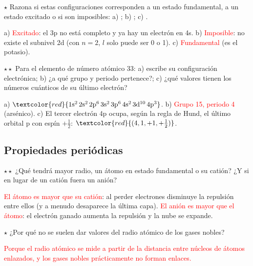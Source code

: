 \begin{exercise}
    \(\star\) Razona si estas configuraciones corresponden a un estado fundamental, a un estado excitado o si son imposibles:\newline
    a) ; b) ; c) .
    \begin{solu}
        a) \textcolor{red}{Excitado}: el 3p no está completo y ya hay un electrón en 4s. b) \textcolor{red}{Imposible}: no existe
        el subnivel 2d (con \(n = 2\), \(l\) solo puede ser 0 o 1). c) \textcolor{red}{Fundamental} (es el potasio).
    \end{solu}
\end{exercise}

\begin{exercise}
    \(\star\star\) Para el elemento de número atómico 33: a) escribe su configuración electrónica; b) ¿a qué grupo y periodo
    pertenece?; c) ¿qué valores tienen los números cuánticos de su último electrón?
    \begin{solu}
        a) \(\textcolor{red}{\conf{1s^2\,2s^2\,2p^6\,3s^2\,3p^6\,4s^2\,3d^{10}\,4p^3}}\). b) \textcolor{red}{Grupo 15, periodo 4}
        (arsénico). c) El tercer electrón 4p ocupa, según la regla de Hund, el último orbital p con espín \(+\frac{1}{2}\):
        \(\textcolor{red}{(4, 1, +1, +\frac{1}{2})}\).
    \end{solu}
\end{exercise}

\subsection{Propiedades periódicas}

\begin{exercise}
    \(\star\star\) ¿Qué tendrá mayor radio, un átomo en estado fundamental o su catión? ¿Y si en lugar de un catión fuera un anión?
    \begin{solu}
        \textcolor{red}{El átomo es mayor que su catión}: al perder electrones disminuye la repulsión entre ellos (y a menudo
        desaparece la última capa). \textcolor{red}{El anión es mayor que el átomo}: el electrón ganado aumenta la repulsión y la
        nube se expande.
    \end{solu}
\end{exercise}

\begin{exercise}
    \(\star\) ¿Por qué no se suelen dar valores del radio atómico de los gases nobles?
    \begin{solu}
        \textcolor{red}{Porque el radio atómico se mide a partir de la distancia entre núcleos de átomos enlazados, y los gases
        nobles prácticamente no forman enlaces.}
    \end{solu}
\end{exercise}

